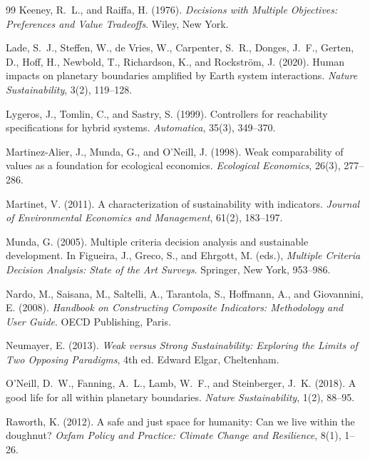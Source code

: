 \begin{thebibliography}{99}
 Keeney, R.~L., and Raiffa, H. (1976). \emph{Decisions with Multiple Objectives: Preferences and Value Tradeoffs}. Wiley, New York.

 Lade, S.~J., Steffen, W., de Vries, W., Carpenter, S.~R., Donges, J.~F., Gerten, D., Hoff, H., Newbold, T., Richardson, K., and Rockstr\"om, J. (2020). Human impacts on planetary boundaries amplified by Earth system interactions. \emph{Nature Sustainability}, 3(2), 119--128.

 Lygeros, J., Tomlin, C., and Sastry, S. (1999). Controllers for reachability specifications for hybrid systems. \emph{Automatica}, 35(3), 349--370.

 Martinez-Alier, J., Munda, G., and O'Neill, J. (1998). Weak comparability of values as a foundation for ecological economics. \emph{Ecological Economics}, 26(3), 277--286.

 Martinet, V. (2011). A characterization of sustainability with indicators. \emph{Journal of Environmental Economics and Management}, 61(2), 183--197.

 Munda, G. (2005). Multiple criteria decision analysis and sustainable development. In Figueira, J., Greco, S., and Ehrgott, M. (eds.), \emph{Multiple Criteria Decision Analysis: State of the Art Surveys}. Springer, New York, 953--986.

 Nardo, M., Saisana, M., Saltelli, A., Tarantola, S., Hoffmann, A., and Giovannini, E. (2008). \emph{Handbook on Constructing Composite Indicators: Methodology and User Guide}. OECD Publishing, Paris.

 Neumayer, E. (2013). \emph{Weak versus Strong Sustainability: Exploring the Limits of Two Opposing Paradigms}, 4th ed. Edward Elgar, Cheltenham.

 O'Neill, D.~W., Fanning, A.~L., Lamb, W.~F., and Steinberger, J.~K. (2018). A good life for all within planetary boundaries. \emph{Nature Sustainability}, 1(2), 88--95.

 Raworth, K. (2012). A safe and just space for humanity: Can we live within the doughnut? \emph{Oxfam Policy and Practice: Climate Change and Resilience}, 8(1), 1--26.


\end{thebibliography}
